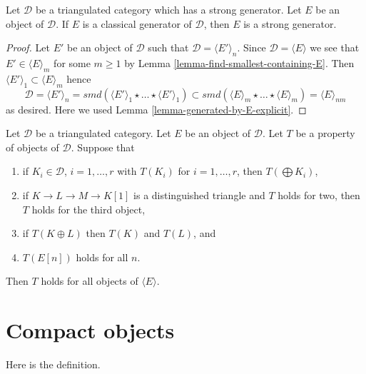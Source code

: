 \begin{lemma}
\label{lemma-classical-generator-strong-generator}
Let $\mathcal{D}$ be a triangulated category which has a strong generator.
Let $E$ be an object of $\mathcal{D}$. If $E$ is a classical generator of
$\mathcal{D}$, then $E$ is a strong generator.
\end{lemma}

\begin{proof}
Let $E'$ be an object of $\mathcal{D}$ such that
$\mathcal{D} = \langle E' \rangle_n$. Since
$\mathcal{D} = \langle E \rangle$ we see that $E' \in \langle E \rangle_m$
for some $m \geq 1$ by Lemma \ref{lemma-find-smallest-containing-E}.
Then $\langle E' \rangle_1 \subset \langle E \rangle_m$ hence
$$
\mathcal{D} =
\langle E' \rangle_n = smd(
\langle E' \rangle_1 \star \ldots \star \langle E' \rangle_1)
\subset
smd(
\langle E \rangle_m \star \ldots \star \langle E \rangle_m)
=
\langle E \rangle_{nm}
$$
as desired. Here we used Lemma \ref{lemma-generated-by-E-explicit}.
\end{proof}

\begin{remark}
\label{remark-check-on-generator}
Let $\mathcal{D}$ be a triangulated category. Let $E$ be an object
of $\mathcal{D}$. Let $T$ be a property of objects of $\mathcal{D}$.
Suppose that
\begin{enumerate}
\item if $K_i \in \mathcal{D}$, $i = 1, \ldots, r$ with
$T(K_i)$ for $i = 1, \ldots, r$, then $T(\bigoplus K_i)$,
\item if $K \to L \to M \to K[1]$ is a distinguished triangle and
$T$ holds for two, then $T$ holds for the third object,
\item if $T(K \oplus L)$ then $T(K)$ and $T(L)$, and
\item $T(E[n])$ holds for all $n$.
\end{enumerate}
Then $T$ holds for all objects of $\langle E \rangle$.
\end{remark}












\section{Compact objects}
\label{section-compact}

\noindent
Here is the definition.

